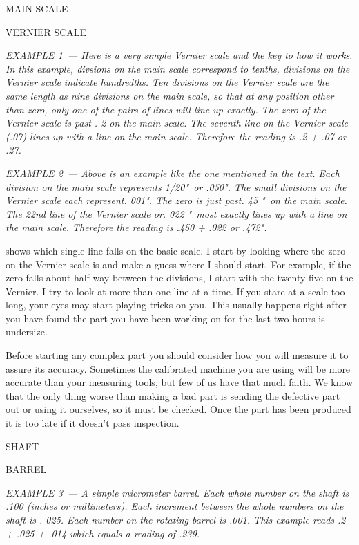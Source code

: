 \bigskip
MAIN SCALE

VERNIER SCALE
\bigskip

\textit{EXAMPLE 1\ --- Here is a very simple Vernier scale and the key to how it
works. In this example, divsions on the main scale correspond to tenths,
divisions on the Vernier scale indicate hundredths. Ten divisions on the Vernier
scale are the same length as nine divisions on the main scale, so that at any
position other than zero, only one of the pairs of lines will line up exactly.
The zero of the Vernier scale is past . 2 on the main scale. The seventh line on
the Vernier scale (.07) lines up with a line on the main scale. Therefore the
reading is .2 + .07 or .27.}
\bigskip

\textit{EXAMPLE 2\ --- Above is an example like the one mentioned in the text.
Each division on the main scale represents 1/20"\ or .050". The small divisions
on the Vernier scale each represent. 001". The zero is just past. 45 "\ on the
main scale. The 22nd line of the Vernier scale or. 022 "\ most exactly lines up
with a line on the main scale. Therefore the reading is .450 + .022 or .472".}
\bigskip

shows which single line falls on the basic scale. I start by looking where the
zero on the Vernier scale is and make a guess where I should start. For example,
if the zero falls about half way between the divisions, I start with the
twenty-five on the Vernier. I try to look at more than one line at a time. If
you stare at a scale too long, your eyes may start playing tricks on you. This
usually happens right after you have found the part you have been working on for
the last two hours is undersize.


Before starting any complex part you should consider how you will measure it to
assure its accuracy. Sometimes the calibrated machine you are using will be more
accurate than your measuring tools, but few of us have that much faith. We know
that the only thing worse than making a bad part is sending the defective part
out or using it ourselves, so it must be checked. Once the part has been
produced it is too late if it doesn't pass inspection.

\bigskip
SHAFT

BARREL
\bigskip

\textit{EXAMPLE 3\ --- A simple micrometer barrel. Each whole number on the
shaft is .100 (inches or millimeters). Each increment between the whole numbers
on the shaft is . 025. Each number on the rotating barrel is .001. This example
reads .2 + .025 + .014 which equals a reading of .239.}
\bigskip

